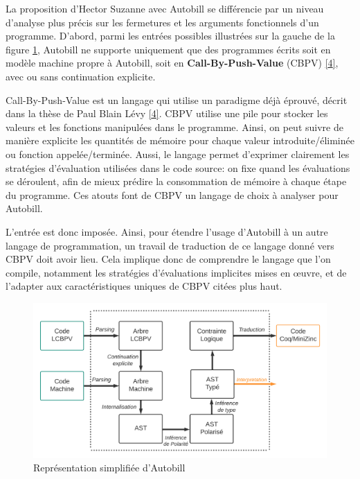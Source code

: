 \documentclass[
  12pt,
]{article}
\begin{document}
La proposition d'Hector Suzanne avec Autobill se différencie par un
niveau d'analyse plus précis sur les fermetures et les arguments
fonctionnels d'un programme. D'abord, parmi les entrées possibles
illustrées sur la gauche de la figure \ref{fig1}, Autobill ne supporte
uniquement que des programmes écrits soit en modèle machine propre à
Autobill, soit en \textbf{Call-By-Push-Value} (CBPV)
\protect\hyperlink{ref-Levy}{{[}4{]}}, avec ou sans continuation
explicite.

Call-By-Push-Value est un langage qui utilise un paradigme déjà éprouvé,
décrit dans la thèse de Paul Blain Lévy
\protect\hyperlink{ref-Levy}{{[}4{]}}. CBPV utilise une pile pour
stocker les valeurs et les fonctions manipulées dans le programme.
Ainsi, on peut suivre de manière explicite les quantités de mémoire pour
chaque valeur introduite/éliminée ou fonction appelée/terminée. Aussi,
le langage permet d'exprimer clairement les stratégies d'évaluation
utilisées dans le code source: on fixe quand les évaluations se
déroulent, afin de mieux prédire la consommation de mémoire à chaque
étape du programme. Ces atouts font de CBPV un langage de choix à
analyser pour Autobill.

L'entrée est donc imposée. Ainsi, pour étendre l'usage d'Autobill à un
autre langage de programmation, un travail de traduction de ce langage
donné vers CBPV doit avoir lieu. Cela implique donc de comprendre le
langage que l'on compile, notamment les stratégies d'évaluations
implicites mises en œuvre, et de l'adapter aux caractéristiques uniques
de CBPV citées plus haut.

\begin{figure}
  \centering
  \includegraphics{Figures/Schema_Autobill.png}
  \caption{Représentation simplifiée d'Autobill\label{fig1}}
\end{figure}

\newpage
\end{document}
